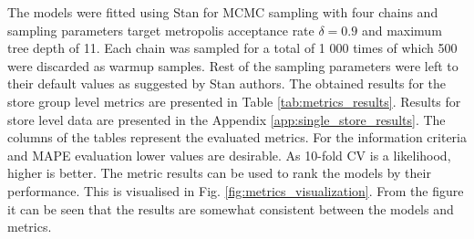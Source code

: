 \documentclass[english, 12pt, a4paper, sci, utf8, a-1b, online]{aaltothesis}
\begin{document}









The models were fitted using Stan for MCMC sampling with four chains and sampling parameters target metropolis acceptance rate $\delta = 0.9$ and maximum tree depth of 11. Each chain was sampled for a total of 1 000 times of which 500 were discarded as warmup samples. Rest of the sampling parameters were left to their default values as suggested by Stan authors. The obtained results for the store group level metrics are presented in Table \ref{tab:metrics_results}. Results for store level data are presented in the Appendix \ref{app:single_store_results}. The columns of the tables represent the evaluated metrics. For the information criteria and MAPE evaluation lower values are desirable. As 10-fold CV is a likelihood, higher is better. The metric results can be used to rank the models by their performance. This is visualised in Fig. \ref{fig:metrics_visualization}. From the figure it can be seen that the results are somewhat consistent between the models and metrics.

\end{document}
